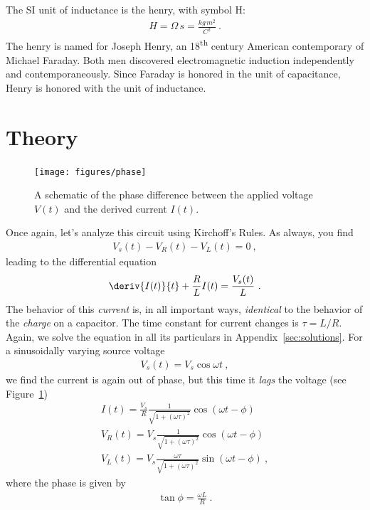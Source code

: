 \documentclass[12pt]{article}
\begin{document}
The SI unit of inductance is the henry, with symbol \unit{H}:
\begin{gather*}
  \unit{H} = \unit{\Omega\, s} = \unit{\frac{kg\, m^2}{C^2}}\ .
\end{gather*}
The henry is named for Joseph Henry, an 18\textsuperscript{th} century
American contemporary of Michael Faraday.  Both men discovered
electromagnetic induction independently and contemporaneously.  Since
Faraday is honored in the unit of capacitance, Henry is honored with
the unit of inductance.

\section{Theory}
\label{sec:theory}

\begin{figure}
  \centering
  \texttt{[image: figures/phase]}
  \caption{A schematic of the phase difference between the applied
    voltage $V(t)$ and the derived current $I(t)$.}
  \label{fig:phase}
\end{figure}
Once again, let's analyze this circuit using Kirchoff's Rules.  As
always, you find
\begin{gather*}
  V_s(t) - V_R(t) - V_L(t) = 0\ ,
\end{gather*}
leading to the differential equation
\begin{gather*}
  \deriv{I(t)}{t} + \frac{R}{L} I(t) = \frac{V_s(t)}{L}\ .
\end{gather*}
The behavior of this \textit{current} is, in all important ways,
\textit{identical} to the behavior of the \textit{charge} on a
capacitor.  The time constant for current changes is $\tau = L/R$.
Again, we solve the equation in all its particulars in
Appendix~\ref{sec:solutions}.  For a sinusoidally varying source
voltage
\begin{gather*}
  V_s(t) = V_s \cos\omega t\ ,
\end{gather*}
we find the current is again out of phase, but this time it
\textit{lags} the voltage (see Figure~\ref{fig:phase})
\begin{gather*}
  I(t) = \frac{V_s}{R} \frac{1}{\sqrt{1 + (\omega \tau)^2}}
  \cos(\omega t - \phi)\\
  V_R(t) = V_s \frac{1}{\sqrt{1 + (\omega \tau)^2}}
  \cos(\omega t - \phi)\\
  V_L(t) = V_s \frac{\omega \tau}{\sqrt{1 + (\omega \tau)^2}}
  \sin(\omega t - \phi)\ ,
\end{gather*}
where the phase is given by 
\begin{gather*}
  \tan \phi = \frac{\omega L}{R}\ .
\end{gather*}
\end{document}
